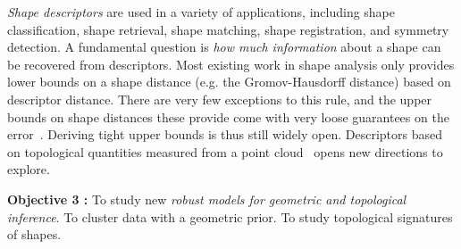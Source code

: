 {\em Shape descriptors} are used in a variety of applications, including shape classification, shape retrieval, shape matching, shape registration, and symmetry detection.  %
A fundamental question is {\em how much information} about a shape can be recovered from descriptors. Most existing work in shape analysis only provides lower bounds on a shape distance (e.g. the Gromov-Hausdorff distance) based on descriptor distance. There are very few exceptions to this rule, and the upper bounds on shape distances these provide come with very loose guarantees on the error~\cite{bbk-gmds-06,ms-gh-05}. Deriving tight upper bounds is thus still widely open.  Descriptors based on topological quantities measured from a point cloud~\cite{ccgmo-ghsssp-09, socg-pbsds-10} opens new directions to explore. 



\vspace{2mm}

{\bf Objective 3 :} To study new {\em robust models for geometric and topological inference}.  To cluster data with a geometric prior. To study topological signatures of shapes.

